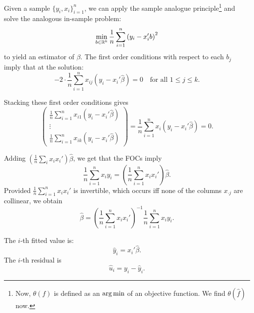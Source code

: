 \begin{remark}	Given a sample $\{y_i,x_i\}_{i=1}^n$, we can apply the sample analogue principle\footnote{Now, $\theta(f)$ is defined as an $\operatorname*{arg\,min}$ of an objective function. We find $\theta(\hat{f})$ now.} and solve the analogous in-sample problem:
	\[
		\min_{b\in\mathbb{R}^k}\frac{1}{n}\sum_{i=1}^n\left(y_i-x_i'b\right)^2
	\]
	to yield an estimator of $\beta$. The first order conditions with respect to each $b_j$ imply that at the solution:
	\[
		-2\cdot\frac{1}{n}\sum_{i=1}^n x_{ij}\left(y_i-x_i'\hat\beta\right)=0\quad\text{for all }1\le j\le k.
	\]

	Stacking these first order conditions gives
	\[
		\begin{pmatrix}
			\frac{1}{n}\sum_{i=1}^n x_{i1}(y_i-x_i'\hat\beta) \\
			\vdots                                            \\
			\frac{1}{n}\sum_{i=1}^n x_{ik}(y_i-x_i'\hat\beta)
		\end{pmatrix}
		=
		\frac{1}{n}\sum_{i=1}^n x_i(y_i-x_i'\hat\beta)=0.
	\]

	Adding $\left( \frac{1}{n} \sum_i x_i x_i' \right)\hat{\beta}$, we get that the FOCs imply
	\[
		\frac{1}{n}\sum_{i=1}^n x_iy_i=\left(\frac{1}{n}\sum_{i=1}^n x_ix_i'\right)\hat\beta.
	\]
	Provided $\frac{1}{n}\sum_{i=1}^n x_ix_i'$ is invertible, which occurs iff none of the columns $x_{\cdot j}$ are collinear, we obtain
	\[
		\hat\beta=\left(\frac{1}{n}\sum_{i=1}^n x_ix_i'\right)^{-1}\frac{1}{n}\sum_{i=1}^n x_iy_i.
	\]
\end{remark}

\begin{definition}
	The $i$-th fitted value is:
	\[
		\hat y_i=x_i'\hat\beta.
	\]
	The $i$-th residual is
	\[
		\hat u_i=y_i-\hat y_i.
	\]
\end{definition}

